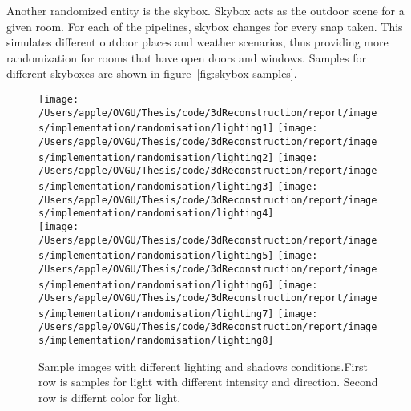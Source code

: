 Another randomized entity is the skybox.
Skybox acts as the outdoor scene for a given room.
For each of the pipelines, skybox changes for every snap taken.
This simulates different outdoor places and weather scenarios, thus providing more randomization for rooms that have open doors and windows.
Samples for different skyboxes are shown in figure~\ref{fig:skybox samples}.


\begin{figure}
    \centering
        \texttt{[image: /Users/apple/OVGU/Thesis/code/3dReconstruction/report/images/implementation/randomisation/lighting1]}
        \texttt{[image: /Users/apple/OVGU/Thesis/code/3dReconstruction/report/images/implementation/randomisation/lighting2]}
        \texttt{[image: /Users/apple/OVGU/Thesis/code/3dReconstruction/report/images/implementation/randomisation/lighting3]}
        \texttt{[image: /Users/apple/OVGU/Thesis/code/3dReconstruction/report/images/implementation/randomisation/lighting4]}\\
    \vspace{0.1cm}
        \texttt{[image: /Users/apple/OVGU/Thesis/code/3dReconstruction/report/images/implementation/randomisation/lighting5]}
        \texttt{[image: /Users/apple/OVGU/Thesis/code/3dReconstruction/report/images/implementation/randomisation/lighting6]}
        \texttt{[image: /Users/apple/OVGU/Thesis/code/3dReconstruction/report/images/implementation/randomisation/lighting7]}
        \texttt{[image: /Users/apple/OVGU/Thesis/code/3dReconstruction/report/images/implementation/randomisation/lighting8]}\\
    \caption{Sample images with different lighting and shadows conditions.First row is samples for light with different intensity and direction. Second row is differnt color for light.}
    \label{fig:Lighting and shadows}
\end{figure}

